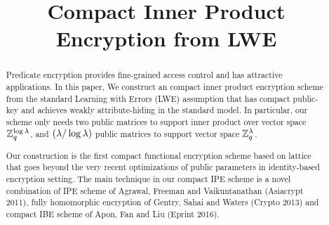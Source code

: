 \documentclass{llncs}
\numberwithin{theorem}{section}
\begin{document}
\title{Compact Inner Product Encryption from LWE}%




\maketitle

\begin{abstract}
Predicate encryption provides fine-grained access control and has attractive applications. In this paper, We construct an compact inner product encryption scheme from the standard Learning with Errors (LWE) assumption that has compact public-key and achieves weakly attribute-hiding in the standard model. In particular, our scheme only needs two public matrices to support inner product over vector space $\mathbb{Z}_q^{\log \lambda}$, and $(\lambda / \log \lambda)$ public matrices to support vector space $\mathbb{Z}_q^{\lambda}$.

Our construction is the first compact functional encryption scheme based on lattice that goes beyond the very recent optimizations of public parameters in identity-based encryption setting. The main technique in our compact IPE scheme is a novel combination of IPE scheme of Agrawal, Freeman and Vaikuntanathan (Asiacrypt 2011), fully homomorphic encryption of Gentry, Sahai and Waters (Crypto 2013) and compact IBE scheme of Apon, Fan and Liu (Eprint 2016).
\end{abstract}
















\begin{appendix}

\end{appendix}
\end{document}
